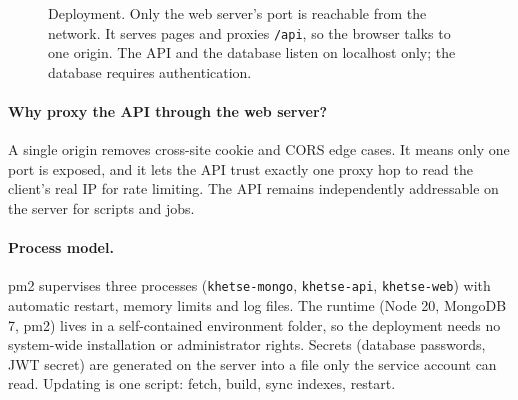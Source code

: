 \documentclass[11pt,a4paper]{article}
\begin{document}
\begin{figure}[H]\centering
{}
\caption{Deployment. Only the web server's port is reachable from the network. It serves pages and proxies \texttt{/api}, so the browser talks to one origin. The API and the database listen on localhost only; the database requires authentication.}
\label{fig:deploy}
\end{figure}

\paragraph{Why proxy the API through the web server?} A single origin removes cross-site cookie and CORS edge cases. It means only one port is exposed, and it lets the API trust exactly one proxy hop to read the client's real IP for rate limiting. The API remains independently addressable on the server for scripts and jobs.

\paragraph{Process model.} pm2 supervises three processes (\texttt{khetse-mongo}, \texttt{khetse-api}, \texttt{khetse-web}) with automatic restart, memory limits and log files. The runtime (Node 20, MongoDB 7, pm2) lives in a self-contained environment folder, so the deployment needs no system-wide installation or administrator rights. Secrets (database passwords, JWT secret) are generated on the server into a file only the service account can read. Updating is one script: fetch, build, sync indexes, restart.
\end{document}
